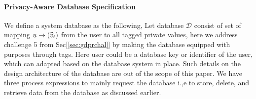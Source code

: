  \paragraph{Privacy-Aware Database Specification}
We define a system database as the following, Let database $ \mathcal{D} $ consist of  set of mapping $ u \rightarrow (\widehat{v}_t) $
 from the user to all tagged private values, here we address challenge 5 from Sec[\ref{sec:gdprchal}] by making the database equipped with purposes through tags. Here user could be a database key or identifier of the user, which can adapted based on the database system in place. Such details on the design architecture of the database are out of the scope of this paper. We have three process expressions to mainly request the database i.,e to store, delete, and retrieve data from the database as discussed earlier.

